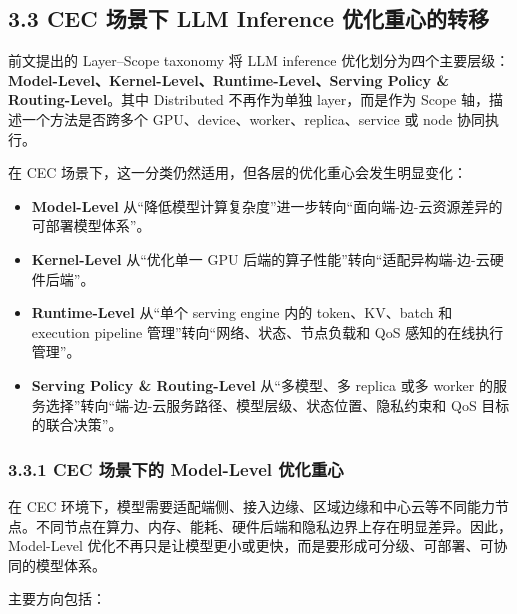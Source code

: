 \documentclass[a4paper,twocolumn,10pt]{ctexart}
\begin{document}
\subsection{3.3 CEC 场景下 LLM Inference 优化重心的转移}



前文提出的 Layer–Scope taxonomy 将 LLM inference 优化划分为四个主要层级：\textbf{Model-Level、Kernel-Level、Runtime-Level、Serving Policy \& Routing-Level}。其中 Distributed 不再作为单独 layer，而是作为 Scope 轴，描述一个方法是否跨多个 GPU、device、worker、replica、service 或 node 协同执行。




在 CEC 场景下，这一分类仍然适用，但各层的优化重心会发生明显变化：




\begin{itemize}
\item \textbf{Model-Level} 从“降低模型计算复杂度”进一步转向“面向端-边-云资源差异的可部署模型体系”。

\item \textbf{Kernel-Level} 从“优化单一 GPU 后端的算子性能”转向“适配异构端-边-云硬件后端”。

\item \textbf{Runtime-Level} 从“单个 serving engine 内的 token、KV、batch 和 execution pipeline 管理”转向“网络、状态、节点负载和 QoS 感知的在线执行管理”。

\item \textbf{Serving Policy \& Routing-Level} 从“多模型、多 replica 或多 worker 的服务选择”转向“端-边-云服务路径、模型层级、状态位置、隐私约束和 QoS 目标的联合决策”。



\end{itemize}




\subsubsection{3.3.1 CEC 场景下的 Model-Level 优化重心}



在 CEC 环境下，模型需要适配端侧、接入边缘、区域边缘和中心云等不同能力节点。不同节点在算力、内存、能耗、硬件后端和隐私边界上存在明显差异。因此，Model-Level 优化不再只是让模型更小或更快，而是要形成可分级、可部署、可协同的模型体系。




主要方向包括：
\end{document}
